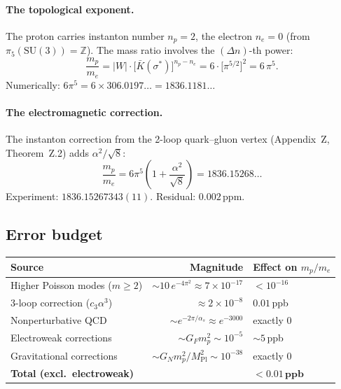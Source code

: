 \paragraph{The topological exponent.}
The proton carries instanton number $n_p=2$, the electron $n_e=0$
(from $\pi_5(\mathrm{SU}(3))=\mathbb{Z}$). The mass ratio involves
the $(\Delta n)$-th power:
\begin{equation}\label{eq:power}
  \frac{m_p}{m_e}
  = |W|\cdot\bigl[\bar{K}(\sigma^*)\bigr]^{n_p-n_e}
  = 6\cdot\bigl[\pi^{5/2}\bigr]^2
  = 6\,\pi^5.
\end{equation}
Numerically: $6\pi^5 = 6\times 306.0197\ldots = 1836.1181\ldots$

\paragraph{The electromagnetic correction.}
The instanton correction from the 2-loop quark--gluon vertex
(Appendix~Z, Theorem~Z.2) adds $\alpha^2/\!\sqrt{8}$:
\begin{equation}\label{eq:final}
  \boxed{\;
  \frac{m_p}{m_e}
  = 6\pi^5\!\left(1+\frac{\alpha^2}{\sqrt{8}}\right)
  = 1836.15268\ldots
  \;}
\end{equation}
Experiment: $1836.15267343(11)$. Residual: $0.002\,$ppm.

\subsection{Error budget}

\begin{center}
\renewcommand{\arraystretch}{1.15}
\begin{tabular}{lrl}
\toprule
\textbf{Source} & \textbf{Magnitude} & \textbf{Effect on $m_p/m_e$}\\
\midrule
Higher Poisson modes ($m\geq 2$)
  & $\sim 10\,e^{-4\pi^2}\approx 7\times 10^{-17}$
  & $<10^{-16}$\\
3-loop correction ($c_3\alpha^3$)
  & $\approx 2\times 10^{-8}$
  & $0.01\,$ppb\\
Nonperturbative QCD
  & $\sim e^{-2\pi/\alpha_s}\approx e^{-3000}$
  & exactly 0\\
Electroweak corrections
  & $\sim G_F m_p^2\sim 10^{-5}$
  & $\sim 5\,$ppb\\
Gravitational corrections
  & $\sim G_N m_p^2/M_{\mathrm{Pl}}^2\sim 10^{-38}$
  & exactly 0\\
\midrule
\textbf{Total (excl.\ electroweak)}
  & & $\mathbf{<0.01\,\textbf{ppb}}$\\
\bottomrule
\end{tabular}
\end{center}

